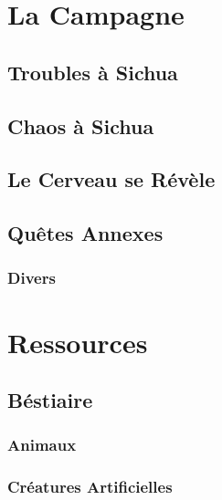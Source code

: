\documentclass{dd}
\begin{document}


\part{La Campagne}


\chapter{Troubles à Sichua}



\chapter{Chaos à Sichua}


\chapter{Le Cerveau se Révèle}


\chapter{Quêtes Annexes}



\section{Divers}



\part{Ressources}

\chapter{Béstiaire}

\section{Animaux}



\section{Créatures Artificielles}








\end{document}
